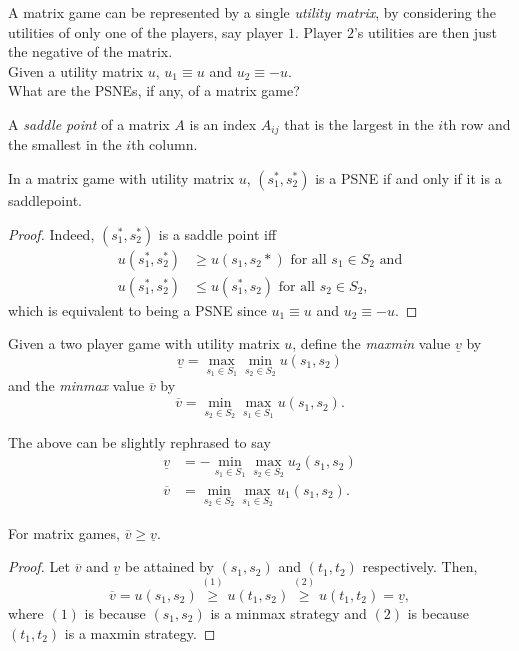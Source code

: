 	A matrix game can be represented by a single \emph{utility matrix}, by considering the utilities of only one of the players, say player $1$. Player $2$'s utilities are then just the negative of the matrix.\\
	Given a utility matrix $u$, $u_1 \equiv u$ and $u_2 \equiv -u$.\\

	What are the PSNEs, if any, of a matrix game?

	\begin{definition}
		A \emph{saddle point} of a matrix $A$ is an index $A_{ij}$ that is the largest in the $i$th row and the smallest in the $i$th column.
	\end{definition}

	\begin{ftheo}
		In a matrix game with utility matrix $u$, $(s_1^*,s_2^*)$ is a PSNE if and only if it is a saddlepoint.
	\end{ftheo}
	\begin{proof}
		Indeed, $(s_1^*,s_2^*)$ is a saddle point iff
		\begin{align*}
			u(s_1^*,s_2^*) &\ge u(s_1,s_2*) \text{ for all $s_1 \in S_2$ and} \\
			u(s_1^*,s_2^*) &\le u(s_1^*,s_2) \text{ for all $s_2 \in S_2$,}
		\end{align*}
		which is equivalent to being a PSNE since $u_1 \equiv u$ and $u_2 \equiv -u$.
	\end{proof}

	\begin{fdef}
		Given a two player game with utility matrix $u$, define the \emph{maxmin} value $\underline{v}$ by
		\[ \underline{v} = \max_{s_1 \in S_1} \min_{s_2 \in S_2} u(s_1,s_2) \]
		and the \emph{minmax} value $\overline{v}$ by
		\[ \overline{v} = \min_{s_2 \in S_2} \max_{s_1 \in S_1} u(s_1,s_2). \]
	\end{fdef}

	The above can be slightly rephrased to say
	\begin{align*}
		\underline{v} &= -\min_{s_1 \in S_1} \max_{s_2 \in S_2} u_2(s_1,s_2) \\
		\overline{v} &= \min_{s_2 \in S_2} \max_{s_1 \in S_2} u_1(s_1,s_2).
	\end{align*}

	\begin{flem}
		\label{lemma: minmax ge maxmin}
		For matrix games, $\overline{v} \ge \underline{v}$.
	\end{flem}
	\begin{proof}
		Let $\overline{v}$ and $\underline{v}$ be attained by $(s_1,s_2)$ and $(t_1,t_2)$ respectively. Then,
		\[ \overline{v} = u(s_1,s_2) \stackrel{(1)}{\ge} u(t_1,s_2) \stackrel{(2)}{\ge} u(t_1,t_2) = \underline{v}, \]
		where $(1)$ is because $(s_1,s_2)$ is a minmax strategy and $(2)$ is because $(t_1,t_2)$ is a maxmin strategy.
	\end{proof}

